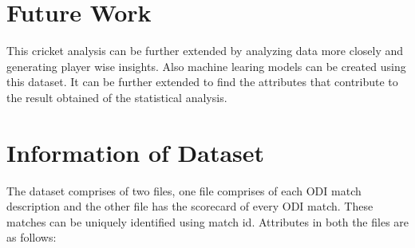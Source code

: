 \documentclass[fleqn,10pt]{wlscirep}
\begin{document}
\section{Future Work}
This cricket analysis can be further extended by analyzing data more closely and generating player wise insights. Also machine learing models can
be created using this dataset. It can be further extended to find the attributes that contribute to the result obtained of the statistical analysis.
\appendix
\section{Information of Dataset}
The dataset comprises of two files, one file comprises of each ODI match description and the other file has the scorecard of every ODI match. These matches can be uniquely
identified using match id. Attributes in both the files are as follows:
\end{document}
